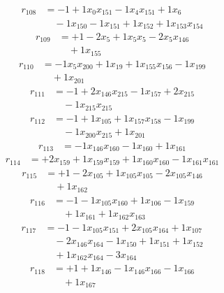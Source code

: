 \[\begin{aligned}
r_{108} &= - 1 + 1 x_{0} x_{151} - 1 x_{4} x_{151} + 1 x_{6} \\
 &\quad - 1 x_{150} - 1 x_{151} + 1 x_{152} + 1 x_{153} x_{154}
\end{aligned}\]
\[\begin{aligned}
r_{109} &= + 1 - 2 x_{5} + 1 x_{5} x_{5} - 2 x_{5} x_{146} \\
 &\quad + 1 x_{155}
\end{aligned}\]
\[\begin{aligned}
r_{110} &= - 1 x_{5} x_{200} + 1 x_{19} + 1 x_{155} x_{156} - 1 x_{199} \\
 &\quad + 1 x_{201}
\end{aligned}\]
\[\begin{aligned}
r_{111} &= - 1 + 2 x_{146} x_{215} - 1 x_{157} + 2 x_{215} \\
 &\quad - 1 x_{215} x_{215}
\end{aligned}\]
\[\begin{aligned}
r_{112} &= - 1 + 1 x_{105} + 1 x_{157} x_{158} - 1 x_{199} \\
 &\quad - 1 x_{200} x_{215} + 1 x_{201}
\end{aligned}\]
\[\begin{aligned}
r_{113} &= - 1 x_{146} x_{160} - 1 x_{160} + 1 x_{161}
\end{aligned}\]
\[\begin{aligned}
r_{114} &= + 2 x_{159} + 1 x_{159} x_{159} + 1 x_{160} x_{160} - 1 x_{161} x_{161}
\end{aligned}\]
\[\begin{aligned}
r_{115} &= + 1 - 2 x_{105} + 1 x_{105} x_{105} - 2 x_{105} x_{146} \\
 &\quad + 1 x_{162}
\end{aligned}\]
\[\begin{aligned}
r_{116} &= - 1 - 1 x_{105} x_{160} + 1 x_{106} - 1 x_{159} \\
 &\quad + 1 x_{161} + 1 x_{162} x_{163}
\end{aligned}\]
\[\begin{aligned}
r_{117} &= - 1 - 1 x_{105} x_{151} + 2 x_{105} x_{164} + 1 x_{107} \\
 &\quad - 2 x_{146} x_{164} - 1 x_{150} + 1 x_{151} + 1 x_{152} \\
 &\quad + 1 x_{162} x_{164} - 3 x_{164}
\end{aligned}\]
\[\begin{aligned}
r_{118} &= + 1 + 1 x_{146} - 1 x_{146} x_{166} - 1 x_{166} \\
 &\quad + 1 x_{167}
\end{aligned}\]
